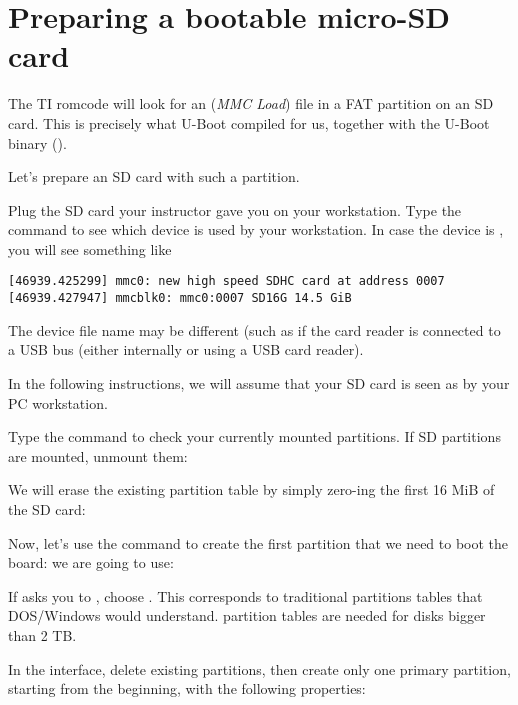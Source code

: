 \section{Preparing a bootable micro-SD card}

The TI romcode will look for an  ({\em MMC Load})
file in a FAT partition on an SD card. This is precisely what U-Boot
compiled for us, together with the U-Boot binary ().

Let's prepare an SD card with such a partition.

Plug the SD card your instructor gave you on your workstation. Type
the  command to see which device is used by your
workstation. In case the device is , you will see
something like

\begin{verbatim}
[46939.425299] mmc0: new high speed SDHC card at address 0007
[46939.427947] mmcblk0: mmc0:0007 SD16G 14.5 GiB
\end{verbatim}

The device file name may be different (such as 
if the card reader is connected to a USB bus (either internally
or using a USB card reader).

In the following instructions, we will assume that your SD card is
seen as  by your PC workstation.

Type the  command to check your currently mounted
partitions. If SD partitions are mounted, unmount them:


We will erase the existing partition table by simply zero-ing the
first 16 MiB of the SD card:


Now, let's use the  command to create the first partition
that we need to boot the board:
we are going to use:


If  asks you to , choose
. This corresponds to traditional partitions tables that DOS/Windows
would understand.  partition tables are needed for disks bigger
than 2 TB.

In the  interface, delete existing partitions, then
create only one primary partition, starting from the beginning, with the 
following properties:

